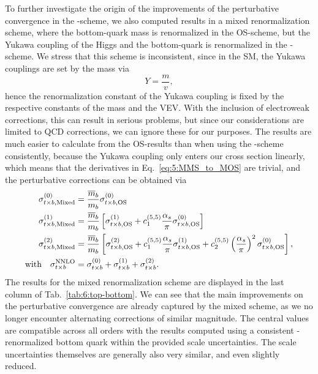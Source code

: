 To further investigate the origin of the improvements of the perturbative convergence in the \MS-scheme, we also computed results in a mixed renormalization scheme, where the bottom-quark mass is renormalized in the \acs{OS}-scheme, but the Yukawa coupling of the Higgs and the bottom-quark is renormalized in the \MS-scheme. We stress that this scheme is inconsistent, since in the \acs{SM}, the Yukawa couplings are set by the mass via
\begin{equation}
Y = \frac{m}{v},
\end{equation}
hence the renormalization constant of the Yukawa coupling is fixed by the respective constants of the mass and the \acs{VEV}. With the inclusion of electroweak corrections, this can result in serious problems, but since our considerations are limited to \acs{QCD} corrections, we can ignore these for our purposes. The results are much easier to calculate from the \acs{OS}-results than when using the \MS-scheme consistently, because the Yukawa coupling only enters our cross section linearly, which means that the derivatives in Eq.~\eqref{eq:5:MMS_to_MOS} are trivial, and the perturbative corrections can be obtained via
\begin{equation}
\begin{split}
\sigma^{(0)}_{t\times b, \text{Mixed}} &= \frac{\overline{m}_b}{m_b} \sigma^{(0)}_{t\times b, \text{OS}} \\
\sigma^{(1)}_{t \times b, \text{Mixed}} &= \frac{\overline{m}_b}{m_b} \left[ \sigma^{(1)}_{t \times b, \text{OS}} + c_1^{(5,5)} \frac{\alpha_s}{\pi} \sigma^{(0)}_{t \times b, \text{OS}} \right] \\
\sigma^{(2)}_{t \times b, \text{Mixed}} &= \frac{\overline{m}_b}{m_b} \left[ \sigma^{(2)}_{t \times b, \text{OS}} + c_1^{(5,5)} \frac{\alpha_s}{\pi} \sigma^{(1)}_{t \times b, \text{OS}} + c_2^{(5,5)} \left( \frac{\alpha_s}{\pi} \right)^2 \sigma^{(0)}_{t \times b, \text{OS}} \right], \\
\text{with} \quad \sigma^{\text{NNLO}}_{t \times b} &= \sigma^{(0)}_{t \times b} + \sigma^{(1)}_{t \times b} + \sigma^{(2)}_{t \times b}.
\end{split}
\end{equation}
The results for the mixed renormalization scheme are displayed in the last column of Tab.~\ref{tab:6:top-bottom}. We can see that the main improvements on the perturbative convergence are already captured by the mixed scheme, as we no longer encounter alternating corrections of similar magnitude. The central values are compatible across all orders with the results computed using a consistent \MS-renormalized bottom quark within the provided scale uncertainties. The scale uncertainties themselves are generally also very similar, and even slightly reduced.

